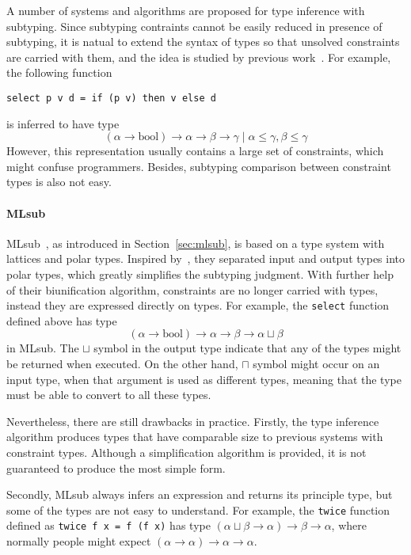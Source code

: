 A number of systems and algorithms are proposed for type inference with subtyping.
Since subtyping contraints cannot be easily reduced in presence of subtyping,
it is natual to extend the syntax of types so that unsolved constraints are carried with them,
and the idea is studied by previous work~\citep{RecConstraint1995, subcon1996}.
For example, the following function
\begin{verbatim}
select p v d = if (p v) then v else d
\end{verbatim}
is inferred to have type
$$(\alpha \to \text{bool}) \to \alpha \to \beta \to \gamma \mid \alpha \le \gamma, \beta \le \gamma$$
However, this representation usually contains a large set of constraints,
which might confuse programmers.
Besides, subtyping comparison between constraint types is also not easy.

\paragraph{MLsub}
MLsub~\citep{mlsub}, as introduced in Section~\ref{sec:mlsub},
is based on a type system with lattices and polar types.
Inspired by~\citep{pottier1998phd}, they separated input and output types into polar types,
which greatly simplifies the subtyping judgment.
With further help of their biunification algorithm,
constraints are no longer carried with types,
instead they are expressed directly on types.
For example, the \verb|select| function defined above has type
$$(\alpha \to \text{bool}) \to \alpha \to \beta \to \alpha \sqcup \beta$$
in MLsub.
The $\sqcup$ symbol in the output type indicate that
any of the types might be returned when executed.
On the other hand, $\sqcap$ symbol might occur on an input type,
when that argument is used as different types,
meaning that the type must be able to convert to all these types.

Nevertheless, there are still drawbacks in practice.
Firstly, the type inference algorithm produces types that have comparable size to
previous systems with constraint types.
Although a simplification algorithm is provided,
it is not guaranteed to produce the most simple form.

Secondly, MLsub always infers an expression and returns its principle type,
but some of the types are not easy to understand.
For example, the \verb|twice| function defined as \verb|twice f x = f (f x)|
has type $(\alpha \sqcup \beta \to \alpha) \to \beta \to \alpha$,
where normally people might expect $(\alpha \to \alpha) \to \alpha \to \alpha$.

